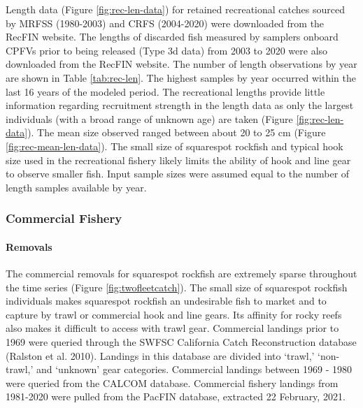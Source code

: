 \documentclass[11pt,
  english,
  a4paper,
]{article}
\begin{document}
Length data (Figure \ref{fig:rec-len-data}) for retained recreational catches sourced by MRFSS (1980-2003) and CRFS (2004-2020) were downloaded from the RecFIN website. The lengths of discarded fish measured by samplers onboard CPFVs prior to being released (Type 3d data) from 2003 to 2020 were also downloaded from the RecFIN website. The number of length observations by year are shown in Table \ref{tab:rec-len}. The highest samples by year occurred within the last 16 years of the modeled period. The recreational lengths provide little information regarding recruitment strength in the length data as only the largest individuals (with a broad range of unknown age) are taken (Figure \ref{fig:rec-len-data}). The mean size observed ranged between about 20 to 25 cm (Figure \ref{fig:rec-mean-len-data}). The small size of squarespot rockfish and typical hook size used in the recreational fishery likely limits the ability of hook and line gear to observe smaller fish. Input sample sizes were assumed equal to the number of length samples available by year.

\leavevmode\tagmcend\tagstructend\par


\hypertarget{commercial-fishery}{%
\subsubsection{Commercial Fishery}\label{commercial-fishery}}

\leavevmode\tagmcend\tagstructend


\hypertarget{removals-1}{%
\paragraph{Removals}\label{removals-1}}

\leavevmode\tagmcend\tagstructend


The commercial removals for squarespot rockfish are extremely sparse throughout the time series (Figure \ref{fig:twofleetcatch}). The small size of squarespot rockfish individuals makes squarespot rockfish an undesirable fish to market and to capture by trawl or commercial hook and line gears. Its affinity for rocky reefs also makes it difficult to access with trawl gear. Commercial landings prior to 1969 were queried through the SWFSC California Catch Reconstruction database {(Ralston et al. 2010)\leavevmode\tagmcend\tagstructend}. Landings in this database are divided into `trawl,' `non-trawl,' and `unknown' gear categories. Commercial landings between 1969 - 1980 were queried from the CALCOM database. Commercial fishery landings from 1981-2020 were pulled from the PacFIN database, extracted 22 February, 2021.
\end{document}
